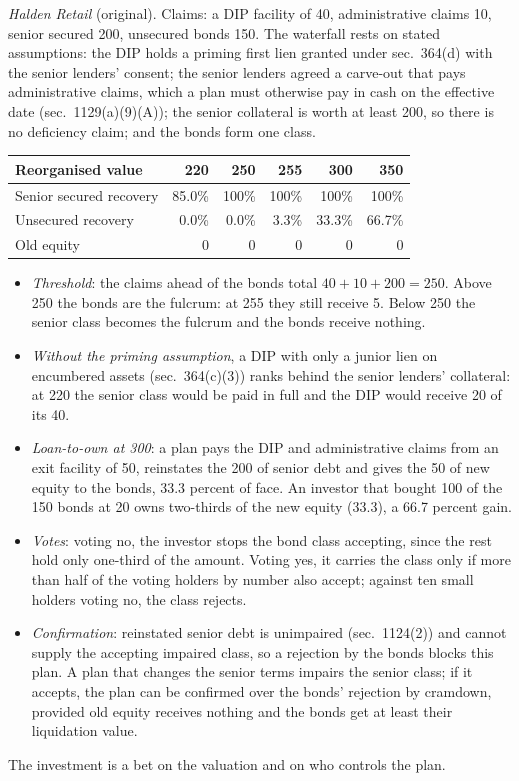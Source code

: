 \begin{qfmethod}
 \emph{Halden Retail} (original). Claims: a DIP facility of 40, administrative claims 10, senior secured 200, unsecured bonds 150. The waterfall rests on stated assumptions: the DIP holds a priming first lien granted under sec.~364(d) with the senior lenders' consent; the senior lenders agreed a carve-out that pays administrative claims, which a plan must otherwise pay in cash on the effective date (sec.~1129(a)(9)(A)); the senior collateral is worth at least 200, so there is no deficiency claim; and the bonds form one class.
\begin{center}\small
\begin{tabular}{@{}lrrrrr@{}}
\toprule
Reorganised value & 220 & 250 & 255 & 300 & 350 \\
\midrule
Senior secured recovery & 85.0\% & 100\% & 100\% & 100\% & 100\% \\
Unsecured recovery & 0.0\% & 0.0\% & 3.3\% & 33.3\% & 66.7\% \\
Old equity & 0 & 0 & 0 & 0 & 0 \\
\bottomrule
\end{tabular}
\end{center}
\begin{itemize}
\item \emph{Threshold}: the claims ahead of the bonds total $40+10+200=250$. Above 250 the bonds are the fulcrum: at 255 they still receive 5. Below 250 the senior class becomes the fulcrum and the bonds receive nothing.
\item \emph{Without the priming assumption}, a DIP with only a junior lien on encumbered assets (sec.~364(c)(3)) ranks behind the senior lenders' collateral: at 220 the senior class would be paid in full and the DIP would receive 20 of its 40.
\item \emph{Loan-to-own at 300}: a plan pays the DIP and administrative claims from an exit facility of 50, reinstates the 200 of senior debt and gives the 50 of new equity to the bonds, 33.3 percent of face. An investor that bought 100 of the 150 bonds at 20 owns two-thirds of the new equity (33.3), a 66.7 percent gain.
\item \emph{Votes}: voting no, the investor stops the bond class accepting, since the rest hold only one-third of the amount. Voting yes, it carries the class only if more than half of the voting holders by number also accept; against ten small holders voting no, the class rejects.
\item \emph{Confirmation}: reinstated senior debt is unimpaired (sec.~1124(2)) and cannot supply the accepting impaired class, so a rejection by the bonds blocks this plan. A plan that changes the senior terms impairs the senior class; if it accepts, the plan can be confirmed over the bonds' rejection by cramdown, provided old equity receives nothing and the bonds get at least their liquidation value.
\end{itemize}
The investment is a bet on the valuation and on who controls the plan.


\end{qfmethod}
